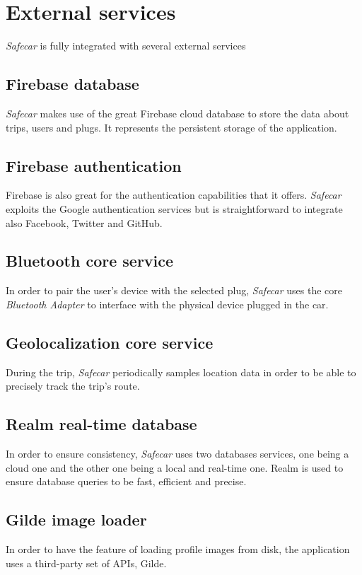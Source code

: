 \section{External services}
\textit{Safecar} is fully integrated with several external services

\subsection{Firebase database}
\textit{Safecar} makes use of the great Firebase cloud database to store the data about trips, users and plugs. It represents the persistent storage of the application.

\subsection{Firebase authentication}
Firebase is also great for the authentication capabilities that it offers. \textit{Safecar} exploits the Google authentication services but is straightforward to integrate also Facebook, Twitter and GitHub.

\subsection{Bluetooth core service}
In order to pair the user's device with the selected plug, \textit{Safecar} uses the core \textit{Bluetooth Adapter} to interface with the physical device plugged in the car.

\subsection{Geolocalization core service}
During the trip, \textit{Safecar} periodically samples location data in order to be able to precisely track the trip's route.

\subsection{Realm real-time database}
In order to ensure consistency, \textit{Safecar} uses two databases services, one being a cloud one and the other one being a local and real-time one. Realm is used to ensure database queries to be fast, efficient and precise.

\subsection{Gilde image loader}
In order to have the feature of loading profile images from disk, the application uses a third-party set of APIs, Gilde.

